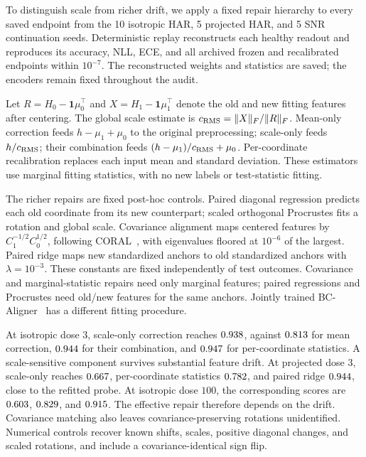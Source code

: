 \documentclass{article}
\begin{document}
To distinguish scale from richer drift, we apply a fixed repair hierarchy to every saved endpoint from the 10 isotropic HAR, 5 projected HAR, and 5 SNR continuation seeds. Deterministic replay reconstructs each healthy readout and reproduces its accuracy, NLL, ECE, and all archived frozen and recalibrated endpoints within $10^{-7}$. The reconstructed weights and statistics are saved; the encoders remain fixed throughout the audit.

Let $R=H_0-\mathbf1\mu_0^\top$ and $X=H_1-\mathbf1\mu_1^\top$ denote the old and new fitting features after centering. The global scale estimate is $c_{\rm RMS}=\|X\|_F/\|R\|_F$. Mean-only correction feeds $h-\mu_1+\mu_0$ to the original preprocessing; scale-only feeds $h/c_{\rm RMS}$; their combination feeds $(h-\mu_1)/c_{\rm RMS}+\mu_0$. Per-coordinate recalibration replaces each input mean and standard deviation. These estimators use marginal fitting statistics, with no new labels or test-statistic fitting.

The richer repairs are fixed post-hoc controls. Paired diagonal regression predicts each old coordinate from its new counterpart; scaled orthogonal Procrustes fits a rotation and global scale. Covariance alignment maps centered features by $C_1^{-1/2}C_0^{1/2}$, following CORAL~\citep{sun2016coral}, with eigenvalues floored at $10^{-6}$ of the largest. Paired ridge maps new standardized anchors to old standardized anchors with $\lambda=10^{-3}$. These constants are fixed independently of test outcomes. Covariance and marginal-statistic repairs need only marginal features; paired regressions and Procrustes need old/new features for the same anchors. Jointly trained BC-Aligner~\citep{hu2022backward} has a different fitting procedure.



At isotropic dose $3$, scale-only correction reaches $0.938$, against $0.813$ for mean correction, $0.944$ for their combination, and $0.947$ for per-coordinate statistics. A scale-sensitive component survives substantial feature drift. At projected dose $3$, scale-only reaches $0.667$, per-coordinate statistics $0.782$, and paired ridge $0.944$, close to the refitted probe. At isotropic dose $100$, the corresponding scores are $0.603$, $0.829$, and $0.915$. The effective repair therefore depends on the drift. Covariance matching also leaves covariance-preserving rotations unidentified. Numerical controls recover known shifts, scales, positive diagonal changes, and scaled rotations, and include a covariance-identical sign flip.
\end{document}
